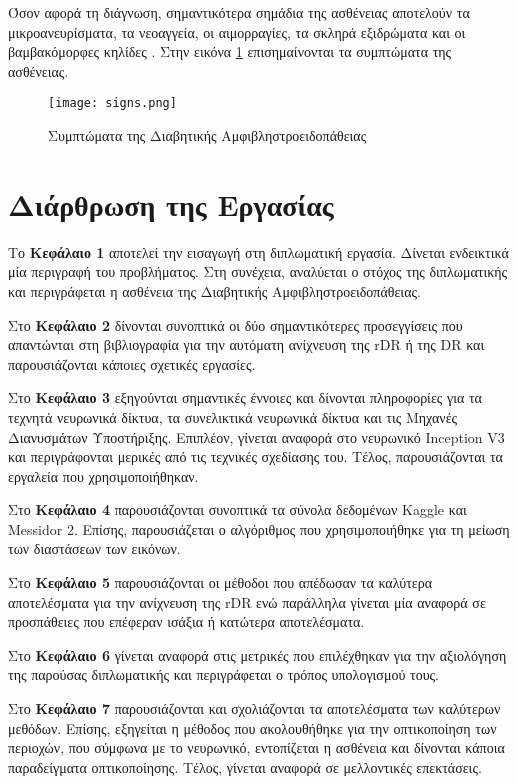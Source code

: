 Όσον αφορά τη διάγνωση, σημαντικότερα σημάδια της ασθένειας αποτελούν τα μικροανευρίσματα, τα νεοαγγεία, οι αιμορραγίες, τα σκληρά  εξιδρώματα και οι βαμβακόμορφες κηλίδες \cite{Nayak}\cite{Acharya}. Στην εικόνα \ref{figure:signs} επισημαίνονται τα συμπτώματα της ασθένειας.


\begin{figure}[!h]
    \centering
      \texttt{[image: signs.png]} \caption{Συμπτώματα της Διαβητικής Αμφιβληστροειδοπάθειας}
       \label{figure:signs}    
  \end{figure}



\section{Διάρθρωση της Εργασίας}
Tο \textbf{Κεφάλαιο 1} αποτελεί την εισαγωγή στη διπλωματική εργασία. Δίνεται ενδεικτικά μία περιγραφή του προβλήματος. Στη συνέχεια, αναλύεται ο στόχος της διπλωματικής και περιγράφεται η ασθένεια της Διαβητικής Αμφιβληστροειδοπάθειας. 

Στο \textbf{Κεφάλαιο 2} δίνονται συνοπτικά οι δύο  σημαντικότερες  προσεγγίσεις που απαντώνται στη βιβλιογραφία για την αυτόματη ανίχνευση της rDR ή της DR και παρουσιάζονται κάποιες σχετικές εργασίες.

Στο \textbf{Κεφάλαιο 3} εξηγούνται σημαντικές έννοιες και δίνονται πληροφορίες για τα τεχνητά νευρωνικά δίκτυα, τα συνελικτικά νευρωνικά δίκτυα και τις Μηχανές Διανυσμάτων Υποστήριξης. Επιπλέον, γίνεται αναφορά στο νευρωνικό Inception V3 και περιγράφονται μερικές από τις τεχνικές σχεδίασης του. Τέλος, παρουσιάζονται τα εργαλεία που χρησιμοποιήθηκαν.

Στο \textbf{Κεφάλαιο 4} παρουσιάζονται συνοπτικά τα σύνολα δεδομένων Kaggle και Messidor 2. Επίσης, παρουσιάζεται ο αλγόριθμος που χρησιμοποιήθηκε για τη μείωση των διαστάσεων των εικόνων.

Στο \textbf{Κεφάλαιο 5} παρουσιάζονται οι μέθοδοι
που απέδωσαν τα καλύτερα αποτελέσματα για την  ανίχνευση της rDR ενώ παράλληλα γίνεται μία  αναφορά σε προσπάθειες που επέφεραν ισάξια ή κατώτερα αποτελέσματα.

Στο \textbf{Κεφάλαιο 6} γίνεται αναφορά στις μετρικές που επιλέχθηκαν για την αξιολόγηση της παρούσας διπλωματικής και περιγράφεται ο τρόπος υπολογισμού τους.

Στο \textbf{Κεφάλαιο 7} παρουσιάζονται και σχολιάζονται τα αποτελέσματα των καλύτερων μεθόδων. Επίσης, εξηγείται η μέθοδος που ακολουθήθηκε για την οπτικοποίηση των περιοχών, που σύμφωνα με το νευρωνικό, εντοπίζεται η ασθένεια και δίνονται κάποια παραδείγματα οπτικοποίησης. Τέλος, γίνεται αναφορά σε μελλοντικές επεκτάσεις.


